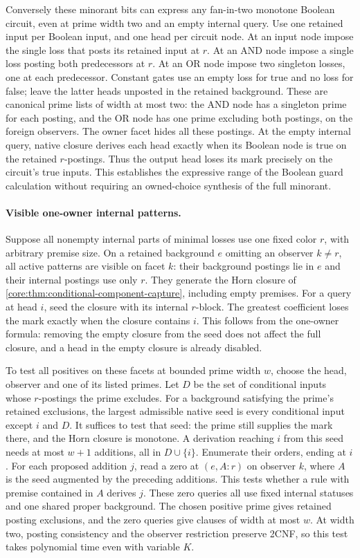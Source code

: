 Conversely these minorant bits can express any
fan-in-two monotone Boolean circuit, even at
prime width two and an empty internal query.
Use one retained input per Boolean input,
and one head per circuit node.
At an input node impose the single loss that
posts its retained input at $r$. At an AND
node impose a single loss posting both
predecessors at $r$. At an OR node impose
two singleton losses, one at each predecessor.
Constant gates use an empty loss for true
and no loss for false; leave the latter heads
unposted in the retained background. These are canonical
prime lists of width at most two: the AND
node has a singleton prime for each posting,
and the OR node has one prime excluding both
postings, on the foreign observers. The owner
facet hides all these postings. At the empty
internal query, native closure derives each
head exactly when its Boolean node is true
on the retained $r$-postings. Thus the output
head loses its mark precisely on the circuit's
true inputs. This establishes the expressive
range of the Boolean guard calculation
without requiring an owned-choice synthesis
of the full minorant.

\paragraph{Visible one-owner internal patterns.}
Suppose all nonempty internal parts of minimal losses
use one fixed color $r$, with arbitrary premise size.
On a retained background $e$ omitting an observer
$k\ne r$, all active patterns are visible on facet $k$:
their background postings lie in $e$ and their internal
postings use only $r$. They generate the Horn closure
of \cref{core:thm:conditional-component-capture}, including
empty premises. For a query at head $i$, seed the
closure with its internal $r$-block. The greatest
coefficient loses the mark exactly when the closure
contains $i$. This follows from the one-owner formula:
removing the empty closure from the seed does not
affect the full closure, and a head in the empty
closure is already disabled.

To test all positives on these facets at bounded prime
width $w$, choose the head, observer and one of its
listed primes. Let $D$ be the set of conditional
inputs whose $r$-postings the prime excludes. For a
background satisfying the prime's retained exclusions,
the largest admissible native seed is every conditional
input except $i$ and $D$. It suffices to test that seed:
the prime still supplies the mark there, and the Horn
closure is monotone. A derivation reaching $i$ from
this seed needs at most $w+1$ additions, all in
$D\cup\{i\}$. Enumerate their orders, ending at $i$.
For each proposed addition $j$, read a zero at
$(e,A:r)$ on observer $k$, where $A$ is the seed
augmented by the preceding additions. This tests
whether a rule with premise contained in $A$ derives
$j$. These zero queries all use fixed internal
statuses and one shared proper background. The
chosen positive prime gives retained posting
exclusions, and the zero queries give clauses of
width at most $w$. At width two, posting consistency
and the observer restriction preserve 2CNF, so this
test takes polynomial time even with variable $K$.

